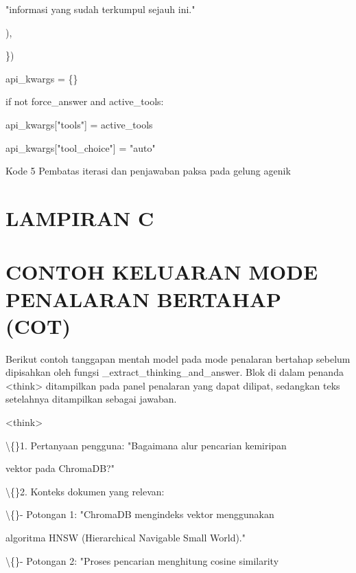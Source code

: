 \documentclass[12pt,a4paper]{article}
\begin{document}
"informasi yang sudah terkumpul sejauh ini."



),



\})



api\_kwargs = \{\}



if not force\_answer and active\_tools:



api\_kwargs{[}"tools"{]} = active\_tools



api\_kwargs{[}"tool\_choice"{]} = "auto"



Kode 5	Pembatas iterasi dan penjawaban paksa pada gelung agenik



\section*{LAMPIRAN C}

\section*{CONTOH KELUARAN MODE PENALARAN BERTAHAP (COT)}

Berikut contoh tanggapan mentah model pada mode penalaran bertahap sebelum dipisahkan oleh fungsi \_extract\_thinking\_and\_answer. Blok di dalam penanda \textless{}think\textgreater{} ditampilkan pada panel penalaran yang dapat dilipat, sedangkan teks setelahnya ditampilkan sebagai jawaban.



\textless{}think\textgreater{}



\textbackslash\{\}1. Pertanyaan pengguna: "Bagaimana alur pencarian kemiripan



vektor pada ChromaDB?"



\textbackslash\{\}2. Konteks dokumen yang relevan:



\textbackslash\{\}- Potongan 1: "ChromaDB mengindeks vektor menggunakan



algoritma HNSW (Hierarchical Navigable Small World)."



\textbackslash\{\}- Potongan 2: "Proses pencarian menghitung cosine similarity
\end{document}
